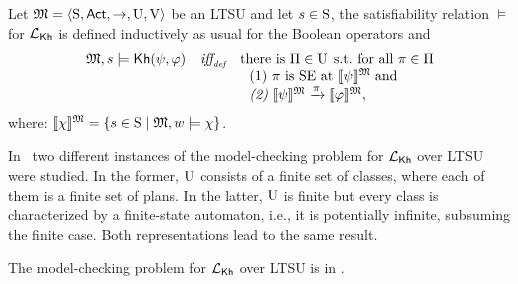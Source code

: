 \begin{definition} \label{def:semantics-kh-uncertain}
    Let $\model = \tup{\S,\Act,\ra,\Unc,\V}$ be an LTSU and let $s\in\S$, the satisfiability relation $\models$ for $\Khlogic$ is defined inductively as usual for the Boolean operators and
    \[
    \begin{array}{l@{\ \ \ }c@{\ \ \  }l}
    \model, s \models \kh(\psi,\varphi) & \iffdef & \text{there is } \plans \in \Unc \;\text{s.t.\ for all } \plan\in\plans \\
    & & \ \ \text{\rm (1)} \ \plan \text{ is SE at }  \truthset{\model}{\psi}\; \text{and} \\
    & & \ \ \text{\em (2)} \ \truthset{\model}{\psi} \reach{\plan} \truthset{\model}{\varphi}, 
    \end{array}
    \]      
    where: $\truthset{\model}{\chi} = \csetsc{s\in\S}{\model,w\models\chi}$. 
\end{definition}

In~\cite{AFSVQ21,DF23} two different instances of the model-checking problem for $\Khlogic$ over LTSU were studied. In the former, $\Unc$ consists of a finite set of classes, where each of them is a finite set of plans. In the latter, $\Unc$ is finite but every class is characterized by a finite-state automaton, i.e., it is potentially infinite, subsuming the finite case. Both representations lead to the same result.

\begin{proposition}
    The model-checking problem for $\Khlogic$ over LTSU is in \PTIME.
\end{proposition}

